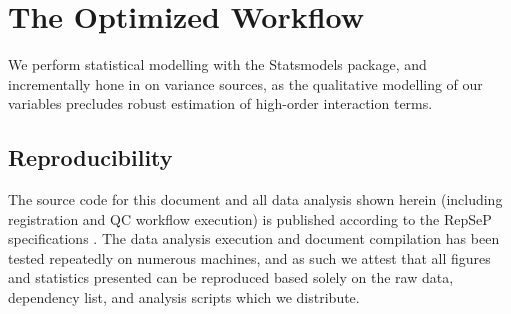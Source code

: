 \section{The Optimized Workflow}
We perform statistical modelling with the Statsmodels \cite{statsmodels} package, and incrementally hone in on variance sources, as the qualitative modelling of our variables precludes robust estimation of high-order interaction terms.



\subsection{Reproducibility}

The source code for this document and all data analysis shown herein (including registration and QC workflow execution) is published according to the RepSeP specifications \cite{repsep}.
The data analysis execution and document compilation has been tested repeatedly on numerous machines, and as such we attest that all figures and statistics presented can be reproduced based solely on the raw data, dependency list, and analysis scripts which we distribute.
